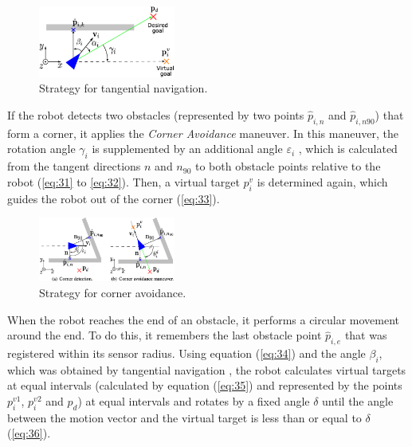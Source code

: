 \documentclass[conference]{IEEEtran}
\begin{document}
\begin{figure}[h]
    \centering
    \includegraphics[width=0.4\textwidth]{Pictures/Strategy for tangential navigation.png}
    \caption{Strategy for tangential navigation.}
    \label{fig:Strategy for tangential navigation}
\end{figure}

If the robot detects two obstacles (represented by two points \( \hat{p}_{i,n} \) and \( \hat{p}_{i,n90} \)) 
that form a corner, it applies the \textit{Corner Avoidance} maneuver. 
In this maneuver, the rotation angle \( \gamma_i \) is supplemented by an additional angle \( \varepsilon_i \) ,
 which is calculated from the tangent directions $n$ and $n_{90}$ to both obstacle points 
relative to the robot 
(\eqref{eq:31} to \eqref{eq:32}). Then,
a virtual target $p_i^v$ is determined again, which guides the robot out of the corner (\eqref{eq:33}).

\begin{figure}[h]
    \centering
    \includegraphics[width=0.4\textwidth]{Pictures/Strategy for corner avoidance.png}
    \caption{Strategy for corner avoidance.}
    \label{fig:Strategy for corner avoidance}
\end{figure}

When the robot reaches the end of an obstacle, it performs a 
circular movement around the end. To do this, it remembers the last 
obstacle point \( \hat{p}_{i,e} \) that was registered within its sensor radius. Using  
equation (\eqref{eq:34}) and the angle \( \beta_{i} \), which was obtained by tangential navigation ,
 the robot calculates virtual targets at equal intervals (calculated 
by equation (\eqref{eq:35}) and represented by the points \( p_i^{v1} \), 
\( p_i^{v2} \) and \( p_d \)) at equal intervals and rotates by a 
fixed angle \( \delta \) until the angle between the motion vector and the virtual 
target is less than or equal to \( \delta \) (\eqref{eq:36}).
\end{document}
